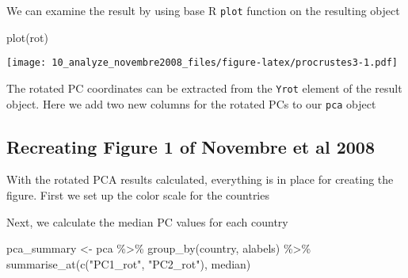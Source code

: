 \documentclass[
]{article}
\newenvironment{Shaded}{\begin{snugshade}}{\end{snugshade}}
\newcommand{\AttributeTok}[1]{\textcolor[rgb]{0.77,0.63,0.00}{#1}}
\newcommand{\DecValTok}[1]{\textcolor[rgb]{0.00,0.00,0.81}{#1}}
\newcommand{\FunctionTok}[1]{\textcolor[rgb]{0.00,0.00,0.00}{#1}}
\newcommand{\NormalTok}[1]{#1}
\newcommand{\OtherTok}[1]{\textcolor[rgb]{0.56,0.35,0.01}{#1}}
\newcommand{\SpecialCharTok}[1]{\textcolor[rgb]{0.00,0.00,0.00}{#1}}
\newcommand{\StringTok}[1]{\textcolor[rgb]{0.31,0.60,0.02}{#1}}
\begin{document}
We can examine the result by using base R \texttt{plot} function on the
resulting object

\begin{Shaded}
\begin{Highlighting}[]
\FunctionTok{plot}\NormalTok{(rot)}
\end{Highlighting}
\end{Shaded}

\texttt{[image: 10\_analyze\_novembre2008\_files/figure-latex/procrustes3-1.pdf]}

The rotated PC coordinates can be extracted from the \texttt{Yrot}
element of the result object. Here we add two new columns for the
rotated PCs to our \texttt{pca} object

\begin{Shaded}
\end{Shaded}

\hypertarget{recreating-figure-1-of-novembre-et-al-2008}{%
\subsection{Recreating Figure 1 of Novembre et al
2008}\label{recreating-figure-1-of-novembre-et-al-2008}}

With the rotated PCA results calculated, everything is in place for
creating the figure. First we set up the color scale for the countries

\begin{Shaded}
\end{Shaded}

Next, we calculate the median PC values for each country

\begin{Shaded}
\begin{Highlighting}[]
\NormalTok{pca\_summary }\OtherTok{\textless{}{-}}\NormalTok{ pca }\SpecialCharTok{\%\textgreater{}\%}
    \FunctionTok{group\_by}\NormalTok{(country, alabels) }\SpecialCharTok{\%\textgreater{}\%}
    \FunctionTok{summarise\_at}\NormalTok{(}\FunctionTok{c}\NormalTok{(}\StringTok{"PC1\_rot"}\NormalTok{, }\StringTok{"PC2\_rot"}\NormalTok{), median)}
\end{Highlighting}
\end{Shaded}
\end{document}
